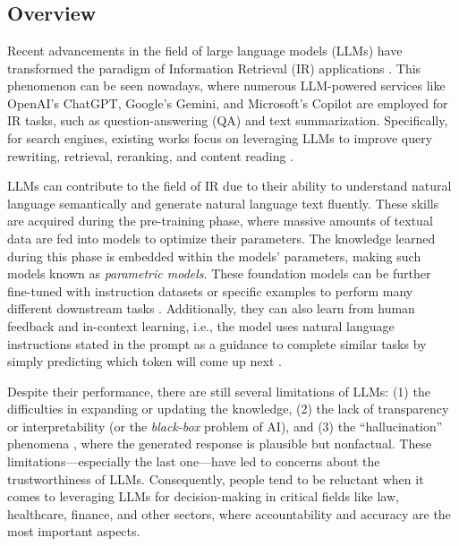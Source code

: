 \chapter{\babSatu}
\label{bab:1}

\section{Overview}
\label{sec:latarBelakang}
Recent advancements in the field of large language models (LLMs) have transformed the paradigm of Information Retrieval (IR) applications \citep{irparadigm}. This phenomenon can be seen nowadays, where numerous LLM-powered services like OpenAI's ChatGPT, Google's Gemini, and Microsoft's Copilot are employed for IR tasks, such as question-answering (QA) and text summarization. Specifically, for search engines, existing works focus on leveraging LLMs to improve query rewriting, retrieval, reranking, and content reading \citep{zhu2024largelanguagemodelsinformation}.

LLMs can contribute to the field of IR due to their ability to understand natural language semantically and generate natural language text fluently. These skills are acquired during the pre-training phase, where massive amounts of textual data are fed into models to optimize their parameters. The knowledge learned during this phase is embedded within the models' parameters, making such models known as \textit{parametric models}. These foundation models can be further fine-tuned with instruction datasets or specific examples to perform many different downstream tasks \citep{ziegler2020finetuninglanguagemodelshuman}. Additionally, they can also learn from human feedback and in-context learning, i.e., the model uses natural language instructions stated in the prompt as a guidance to complete similar tasks by simply predicting which token will come up next \citep{brown2020gpt3}.

Despite their performance, there are still several limitations of LLMs: (1) the difficulties in expanding or updating the knowledge, (2) the lack of transparency or interpretability (or the \textit{black-box} problem of AI), and (3) the ``hallucination'' phenomena \citep{lewis2021retrievalaugmentedgenerationknowledgeintensivenlp}, where the generated response is plausible but nonfactual. These limitations---especially the last one---have led to concerns about the trustworthiness of LLMs. Consequently, people tend to be reluctant when it comes to leveraging LLMs for decision-making in critical fields like law, healthcare, finance, and other sectors, where accountability and accuracy are the most important aspects.


